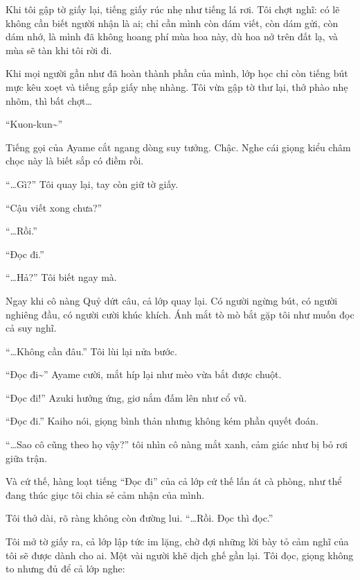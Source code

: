 \documentclass[../main.tex]{subfiles}
\begin{document}
Khi tôi gập tờ giấy lại, tiếng giấy rúc nhẹ như tiếng lá rơi. Tôi chợt nghĩ: có lẽ không cần biết người nhận là ai; chỉ cần mình còn dám viết, còn dám gửi, còn dám nhớ, là mình đã không hoang phí mùa hoa này, dù hoa nở trên đất lạ, và mùa sẽ tàn khi tôi rời đi.

Khi mọi người gần như đã hoàn thành phần của mình, lớp học chỉ còn tiếng bút mực kêu xoẹt và tiếng gấp giấy nhẹ nhàng. Tôi vừa gập tờ thư lại, thở phào nhẹ nhõm, thì bất chợt\dots

``Kuon-kun\~{}''

Tiếng gọi của Ayame cắt ngang dòng suy tưởng. Chậc. Nghe cái giọng kiểu châm chọc này là biết sắp có điềm rồi.

``\dots Gì?'' Tôi quay lại, tay còn giữ tờ giấy.

``Cậu viết xong chưa?''

``\dots Rồi.''

``Đọc đi.''

``\dots Hả?'' Tôi biết ngay mà.

Ngay khi cô nàng Quỷ dứt câu, cả lớp quay lại. Có người ngừng bút, có người nghiêng đầu, có người cười khúc khích. Ánh mắt tò mò bắt gặp tôi như muốn đọc cả suy nghĩ.

``\dots Không cần đâu.'' Tôi lùi lại nửa bước.

``Đọc đi\~{}'' Ayame cười, mắt híp lại như mèo vừa bắt được chuột.

``Đọc đi!'' Azuki hưởng ứng, giơ nắm đấm lên như cổ vũ.

``Đọc đi.'' Kaiho nói, giọng bình thản nhưng không kém phần quyết đoán.

``\dots Sao cô cũng theo họ vậy?'' tôi nhìn cô nàng mắt xanh, cảm giác như bị bỏ rơi giữa trận.

Và cứ thế, hàng loạt tiếng ``Đọc đi'' của cả lớp cứ thế lấn át cà phòng, như thể đang thúc giục tôi chia sẻ cảm nhận của mình.

Tôi thở dài, rõ ràng không còn đường lui. ``\dots Rồi. Đọc thì đọc.''

Tôi mở tờ giấy ra, cả lớp lập tức im lặng, chờ đợi những lời bày tỏ cảm nghĩ của tôi sẽ được dành cho ai. Một vài người khẽ dịch ghế gần lại. Tôi đọc, giọng không to nhưng đủ để cả lớp nghe:
\end{document}
